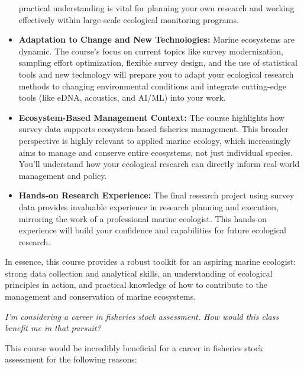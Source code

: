 \documentclass[
  letterpaper,
  oneside,
  open=any]{scrbook}
\begin{document}
\begin{itemize}
  practical understanding is vital for planning your own research and
  working effectively within large-scale ecological monitoring programs.
\item
  \textbf{Adaptation to Change and New Technologies:} Marine ecosystems
  are dynamic. The course's focus on current topics like survey
  modernization, sampling effort optimization, flexible survey design,
  and the use of statistical tools and new technology will prepare you
  to adapt your ecological research methods to changing environmental
  conditions and integrate cutting-edge tools (like eDNA, acoustics, and
  AI/ML) into your work.
\item
  \textbf{Ecosystem-Based Management Context:} The course highlights how
  survey data supports ecosystem-based fisheries management. This
  broader perspective is highly relevant to applied marine ecology,
  which increasingly aims to manage and conserve entire ecosystems, not
  just individual species. You'll understand how your ecological
  research can directly inform real-world management and policy.
\item
  \textbf{Hands-on Research Experience:} The final research project
  using survey data provides invaluable experience in research planning
  and execution, mirroring the work of a professional marine ecologist.
  This hands-on experience will build your confidence and capabilities
  for future ecological research.
\end{itemize}

In essence, this course provides a robust toolkit for an aspiring marine
ecologist: strong data collection and analytical skills, an
understanding of ecological principles in action, and practical
knowledge of how to contribute to the management and conservation of
marine ecosystems.

\emph{I'm considering a career in fisheries stock assessment. How would
this class benefit me in that pursuit?}

This course would be incredibly beneficial for a career in fisheries
stock assessment for the following reasons:
\end{document}
